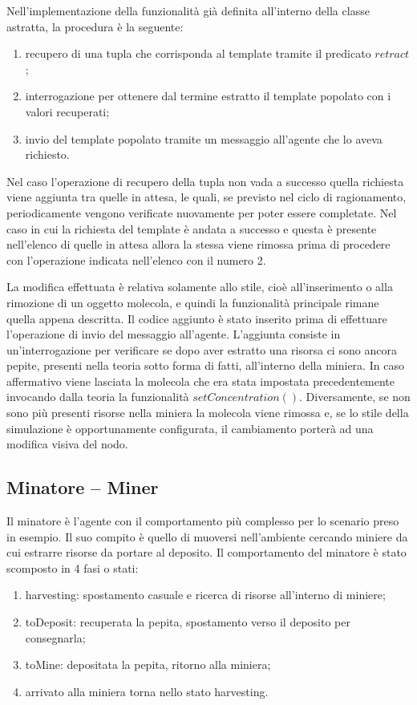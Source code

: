 Nell'implementazione della funzionalità già definita all'interno della classe astratta, la procedura è la seguente:
\begin{enumerate}
\item recupero di una tupla che corrisponda al template tramite il predicato $retract$;
\item interrogazione per ottenere dal termine estratto il template popolato con i valori recuperati;
\item invio del template popolato tramite un messaggio all'agente che lo aveva richiesto.
\end{enumerate}
Nel caso l'operazione di recupero della tupla non vada a successo quella richiesta viene aggiunta tra quelle in attesa, le quali, se previsto nel ciclo di ragionamento, periodicamente vengono verificate nuovamente per poter essere completate.
Nel caso in cui la richiesta del template è andata a successo e questa è presente nell'elenco di quelle in attesa allora la stessa viene rimossa prima di procedere con l'operazione indicata nell'elenco con il numero 2.

La modifica effettuata è relativa solamente allo stile, cioè all'inserimento o alla rimozione di un oggetto molecola, e quindi la funzionalità principale rimane quella appena descritta.
Il codice aggiunto è stato inserito prima di effettuare l'operazione di invio del messaggio all'agente. L'aggiunta consiste in un'interrogazione per verificare se dopo aver estratto una risorsa ci sono ancora pepite, presenti nella teoria sotto forma di fatti, all'interno della miniera. In caso affermativo viene lasciata la molecola che era stata impostata precedentemente invocando dalla teoria la funzionalità $setConcentration()$. Diversamente, se non sono più presenti risorse nella miniera la molecola viene rimossa e, se lo stile della simulazione è opportunamente configurata, il cambiamento porterà ad una modifica visiva del nodo.

\subsection{Minatore -- Miner}
Il minatore è l'agente con il comportamento più complesso per lo scenario preso in esempio.
Il suo compito è quello di muoversi nell'ambiente cercando miniere da cui estrarre risorse da portare al deposito.
Il comportamento del minatore è stato scomposto in 4 fasi o stati:
\begin{enumerate}
\item harvesting: spostamento casuale e ricerca di risorse all'interno di miniere;
\item toDeposit: recuperata la pepita, spostamento verso il deposito per consegnarla;
\item toMine: depositata la pepita, ritorno alla miniera;
\item arrivato alla miniera torna nello stato harvesting.
\end{enumerate}

